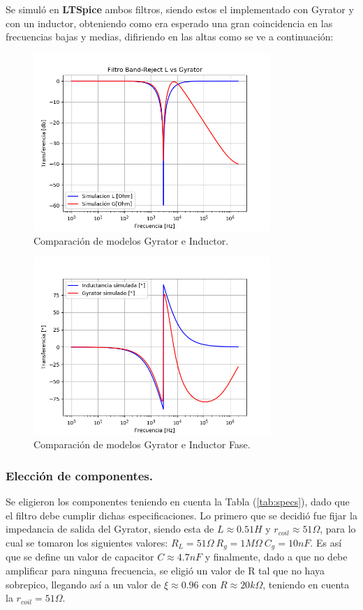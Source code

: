 Se simuló en \textbf{LTSpice} ambos filtros, siendo estos el implementado con Gyrator y con un inductor, obteniendo como era esperado una gran coincidencia en las frecuencias bajas y medias, difiriendo en las altas como se ve a continuación:
\begin{figure}[H]	
	\centering
	\includegraphics[width=0.8\textwidth]{ImagenesEj2/simBR.PNG}
	\caption{Comparación de modelos Gyrator e Inductor.}
	\label{fig:gyrIndBR}
\end{figure}
\begin{figure}[H]	
	\centering
	\includegraphics[width=0.8\textwidth]{ImagenesEj2/simBRP.PNG}
	\caption{Comparación de modelos Gyrator e Inductor Fase.}
	\label{fig:gyrIndPBR}
\end{figure}
\subsubsection{Elección de componentes.}

Se eligieron los componentes teniendo en cuenta la Tabla (\ref{tab:specs}), dado que el filtro debe cumplir dichas especificaciones.
Lo primero que se decidió fue fijar la impedancia de salida del Gyrator, siendo esta de $L \approx 0.51H $ y $r_{coil} \approx 51\Omega $, para lo cual se tomaron los siguientes valores: $R_L = 51\Omega \ R_g = 1M\Omega \ C_g = 10nF$.
Es así que se define un valor de capacitor $C \approx 4.7nF$ y finalmente, dado a que no debe amplificar para ninguna frecuencia, se eligió un valor de R tal que no haya sobrepico, llegando así a un valor de $\xi \approx 0.96 $ con $R \approx 20k\Omega $, teniendo en cuenta la $r_{coil} = 51\Omega$.  

